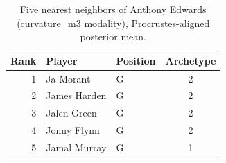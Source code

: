 \begin{table}[htbp]
  \centering\small
  \begin{tabular}{rllc}
    \toprule
    Rank & Player & Position & Archetype \\
    \midrule
    1 & Ja Morant & G & 2 \\
    2 & James Harden & G & 2 \\
    3 & Jalen Green & G & 2 \\
    4 & Jonny Flynn & G & 2 \\
    5 & Jamal Murray & G & 1 \\
    \bottomrule
  \end{tabular}
  \caption{Five nearest neighbors of Anthony Edwards (curvature_m3 modality), Procrustes-aligned posterior mean.}
  \label{tab:Anthony_Edwards_neighbors_curvature_m3}
\end{table}

